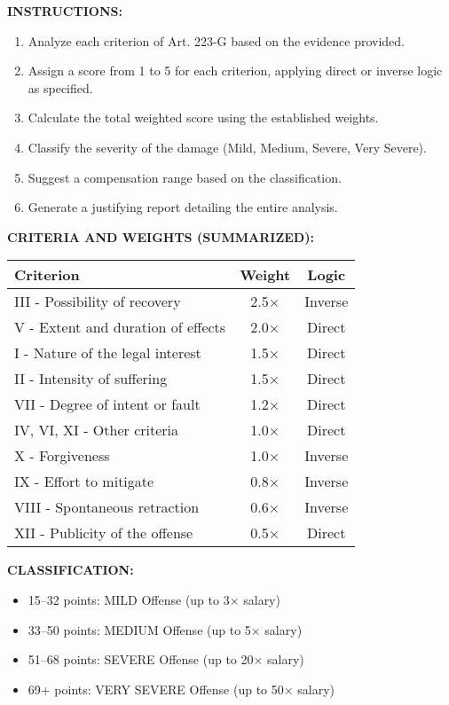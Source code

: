 \documentclass[11pt,a4paper]{article}
\begin{document}
\noindent\textbf{INSTRUCTIONS:}
\begin{enumerate}
    \item Analyze each criterion of Art. 223-G based on the evidence provided.
    \item Assign a score from 1 to 5 for each criterion, applying direct or inverse logic as specified.
    \item Calculate the total weighted score using the established weights.
    \item Classify the severity of the damage (Mild, Medium, Severe, Very Severe).
    \item Suggest a compensation range based on the classification.
    \item Generate a justifying report detailing the entire analysis.
\end{enumerate}

\noindent\textbf{CRITERIA AND WEIGHTS (SUMMARIZED):}

\begin{table}[ht]
\centering
\small
\begin{tabular}{@{}lcc@{}}
\toprule
\textbf{Criterion} & \textbf{Weight} & \textbf{Logic} \\ 
\midrule
III - Possibility of recovery & 2.5× & Inverse \\
V - Extent and duration of effects & 2.0× & Direct \\
I - Nature of the legal interest & 1.5× & Direct \\
II - Intensity of suffering & 1.5× & Direct \\
VII - Degree of intent or fault & 1.2× & Direct \\
IV, VI, XI - Other criteria & 1.0× & Direct \\
X - Forgiveness & 1.0× & Inverse \\
IX - Effort to mitigate & 0.8× & Inverse \\
VIII - Spontaneous retraction & 0.6× & Inverse \\
XII - Publicity of the offense & 0.5× & Direct \\
\bottomrule
\end{tabular}
\end{table}

\noindent\textbf{CLASSIFICATION:}
\begin{itemize}
    \item 15--32 points: MILD Offense (up to 3× salary)
    \item 33--50 points: MEDIUM Offense (up to 5× salary)
    \item 51--68 points: SEVERE Offense (up to 20× salary)
    \item 69+ points: VERY SEVERE Offense (up to 50× salary)
\end{itemize}
\end{document}
